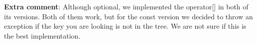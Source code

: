 \DoxyHorRuler


{\bfseries{Extra comment}}\+: Although optional, we implemented the {\ttfamily operator\mbox{[}\mbox{]}} in both of its versions. Both of them work, but for the const version we decided to throw an exception if the key you are looking is not in the tree. We are not sure if this is the best implementation. 